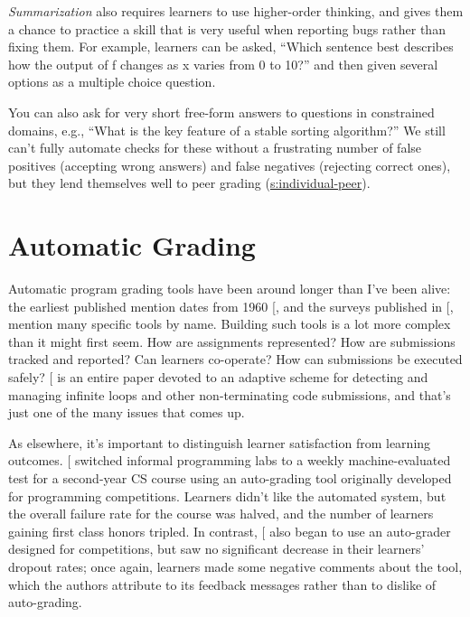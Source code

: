 \emph{Summarization} also requires learners to use higher-order thinking, and
gives them a chance to practice a skill that is very useful when
reporting bugs rather than fixing them. For example, learners can be
asked, ``Which sentence best describes how the output of f changes as x
varies from 0 to 10?'' and then given several options as a multiple
choice question.

You can also ask for very short free-form answers to questions in
constrained domains, e.g., ``What is the key feature of a stable sorting
algorithm?'' We still can't fully automate checks for these without a
frustrating number of false positives (accepting wrong answers) and
false negatives (rejecting correct ones), but they lend themselves well
to peer grading (\protect\hyperlink{SECTION}{s:individual-peer}).

\section{Automatic Grading}\label{s:exercises-grading}

Automatic program grading tools have been around longer than I've been
alive: the earliest published mention dates from 1960
{[}\protect[\hyperlink{b:Holl1960}{Holl1960}]{]}, and the surveys published in
{[},\protect[\hyperlink{b:Ihan2010}{Ihan2010}]{]} mention many specific tools by name.
Building such tools is a lot more complex than it might first seem. How
are assignments represented? How are submissions tracked and reported?
Can learners co-operate? How can submissions be executed safely?
{[}\protect[\hyperlink{b:Edwa2014a}{Edwa2014a}]{]} is an entire paper devoted to an adaptive scheme for
detecting and managing infinite loops and other non-terminating code
submissions, and that's just one of the many issues that comes up.

As elsewhere, it's important to distinguish learner satisfaction from
learning outcomes. {[}\protect[\hyperlink{b:Magu2018}{Magu2018}]{]} switched informal programming labs
to a weekly machine-evaluated test for a second-year CS course using an
auto-grading tool originally developed for programming competitions.
Learners didn't like the automated system, but the overall failure rate
for the course was halved, and the number of learners gaining first
class honors tripled. In contrast, {[}\protect[\hyperlink{b:Rubi2014}{Rubi2014}]{]} also began to use
an auto-grader designed for competitions, but saw no significant
decrease in their learners' dropout rates; once again, learners made
some negative comments about the tool, which the authors attribute to
its feedback messages rather than to dislike of auto-grading.

